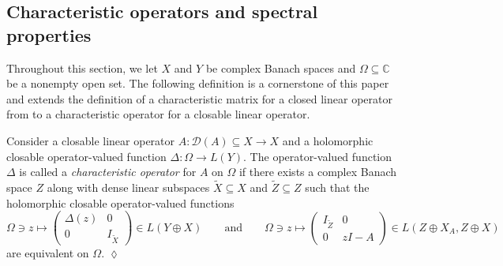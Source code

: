\documentclass[english]{myarticle}
\begin{document}
\begin{sloppypar}
\subsection{Characteristic operators and spectral properties} \label{subsec:char operators}
Throughout this section, we let $X$ and $Y$ be complex Banach spaces and $\Omega \subseteq \mathbb{C}$ be a nonempty open set. The following definition is a cornerstone of this paper and extends the definition of a characteristic matrix for a closed linear operator from \cite[Section I.2]{Kaashoek1992} to a characteristic operator for a closable linear operator.

\begin{definition} \label{def:characoperator}
Consider a closable linear operator $A : \mathcal{D}(A) \subseteq X \to X$ and a holomorphic closable operator-valued function $\Delta : \Omega \to L(Y)$. The operator-valued function $\Delta$ is called a \emph{characteristic operator} for $A$ on $\Omega$ if there exists a complex Banach space $Z$ along with dense linear subspaces $\tilde{X} \subseteq X$ and $\tilde{Z} \subseteq Z$ such that the holomorphic closable operator-valued functions 
\begin{equation*}
\Omega \ni z \mapsto \begin{pmatrix}
        \Delta(z) & 0 \\
        0 & I_{\tilde{X}}
        \end{pmatrix} \in L(Y \oplus X) \qquad \mbox{and} \qquad \Omega \ni z \mapsto \begin{pmatrix}
            I_{\tilde{Z}}& 0 \\
            0 & zI - A
        \end{pmatrix} \in L(Z \oplus X_A, Z \oplus X)
\end{equation*}
are equivalent on $\Omega$. \hfill $\lozenge$
\end{definition}


\end{sloppypar}
\end{document}
